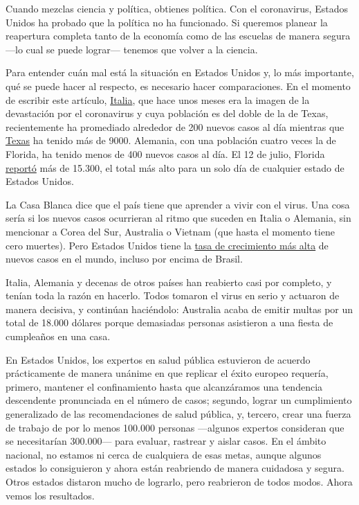 Cuando mezclas ciencia y política, obtienes política. Con el
coronavirus, Estados Unidos ha probado que la política no ha funcionado.
Si queremos planear la reapertura completa tanto de la economía como de
las escuelas de manera segura ---lo cual se puede lograr--- tenemos que
volver a la ciencia.

Para entender cuán mal está la situación en Estados Unidos y, lo más
importante, qué se puede hacer al respecto, es necesario hacer
comparaciones. En el momento de escribir este artículo,
\href{https://www.nytimes.com/interactive/2020/world/coronavirus-maps.html}{Italia},
que hace unos meses era la imagen de la devastación por el coronavirus y
cuya población es del doble de la de Texas, recientemente ha promediado
alrededor de 200 nuevos casos al día mientras que
\href{https://www.nytimes.com/interactive/2020/us/texas-coronavirus-cases.html}{Texas}
ha tenido más de 9000. Alemania, con una población cuatro veces la de
Florida, ha tenido menos de 400 nuevos casos al día. El 12 de julio,
Florida
\href{https://www.nytimes.com/2020/07/12/us/florida-coronavirus-covid-cases.html}{reportó}
más de 15.300, el total más alto para un solo día de cualquier estado de
Estados Unidos.

La Casa Blanca dice que el país tiene que aprender a vivir con el virus.
Una cosa sería si los nuevos casos ocurrieran al ritmo que suceden en
Italia o Alemania, sin mencionar a Corea del Sur, Australia o Vietnam
(que hasta el momento tiene cero muertes). Pero Estados Unidos tiene la
\href{https://coronavirus.jhu.edu/data/new-cases}{tasa de crecimiento
más alta} de nuevos casos en el mundo, incluso por encima de Brasil.

Italia, Alemania y decenas de otros países han reabierto casi por
completo, y tenían toda la razón en hacerlo. Todos tomaron el virus en
serio y actuaron de manera decisiva, y continúan haciéndolo: Australia
acaba de emitir multas por un total de 18.000 dólares porque demasiadas
personas asistieron a una fiesta de cumpleaños en una casa.

En Estados Unidos, los expertos en salud pública estuvieron de acuerdo
prácticamente de manera unánime en que replicar el éxito europeo
requería, primero, mantener el confinamiento hasta que alcanzáramos una
tendencia descendente pronunciada en el número de casos; segundo, lograr
un cumplimiento generalizado de las recomendaciones de salud pública, y,
tercero, crear una fuerza de trabajo de por lo menos 100.000 personas
---algunos expertos consideran que se necesitarían 300.000--- para
evaluar, rastrear y aislar casos. En el ámbito nacional, no estamos ni
cerca de cualquiera de esas metas, aunque algunos estados lo
consiguieron y ahora están reabriendo de manera cuidadosa y segura.
Otros estados distaron mucho de lograrlo, pero reabrieron de todos
modos. Ahora vemos los resultados.

